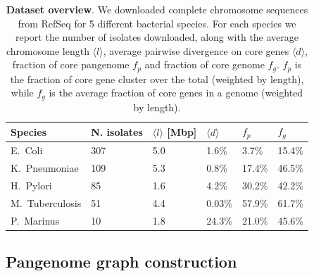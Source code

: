 \documentclass[aps,rmp,reprint,superscriptaddress,notitlepage,10pt,onecolumn]{revtex4-1}
\newcommand{\avg}[1]{\langle #1 \rangle}
\begin{document}

\begin{table}[hb]
    \begin{tabular}{l l l l l l}
        \hline\hline
        Species         & N. isolates & $\avg{l}$ [Mbp] & $\avg{d}$ & $f_p$  & $f_g$  \\
        \hline
        E.~Coli         & 307         & 5.0             & 1.6\%     & 3.7\%  & 15.4\% \\
        K.~Pneumoniae   & 109         & 5.3             & 0.8\%     & 17.4\% & 46.5\% \\
        H.~Pylori       & 85          & 1.6             & 4.2\%     & 30.2\% & 42.2\% \\
        M.~Tuberculosis & 51          & 4.4             & 0.03\%    & 57.9\% & 61.7\% \\
        P.~Marinus      & 10          & 1.8             & 24.3\%    & 21.0\% & 45.6\% \\
        \hline
    \end{tabular}
    \caption{{\bf Dataset overview}. We downloaded complete chromosome sequences from RefSeq for 5 different bacterial species. For each species we report the number of isolates downloaded, along with the average chromosome length $\avg{l}$, average pairwise divergence on core genes $\avg{d}$, fraction of core pangenome $f_p$ and fraction of core genome $f_g$. $f_p$ is the fraction of core gene cluster over the total (weighted by length), while $f_g$ is the average fraction of core genes in a genome (weighted by length).}
    \label{table:panx-dataset}
\end{table}


\subsection{Pangenome graph construction}
\end{document}
